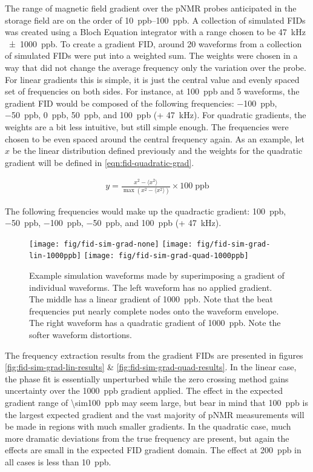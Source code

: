The range of magnetic field gradient over the pNMR probes anticipated in the \gmtwo storage field are on the order of \SIrange{10}{100}{ppb}. A collection of simulated FIDs was created using a Bloch Equation integrator with a range chosen to be \SI{47}{\kHz} \SI{\pm 1000}{ppb}. To create a gradient FID, around 20 waveforms from a collection of simulated FIDs were put into a weighted sum.  The weights were chosen in a way that did not change the average frequency only the variation over the probe.  For linear gradients this is simple, it is just the central value and evenly spaced set of frequencies on both sides.  For instance, at \SI{100}{ppb} and 5 waveforms, the gradient FID would be composed of the following frequencies: \SI{-100}{ppb}, \SI{-50}{ppb}, \SI{0}{ppb}, \SI{50}{ppb}, and \SI{100}{ppb} (+ \SI{47}{\kHz}).  For quadratic gradients, the weights are a bit less intuitive, but still simple enough.  The frequencies were chosen to be even spaced around the central frequency again.  As an example, let $x$ be the linear distribution defined previously and the weights for the quadratic gradient will be defined in \ref{eqn:fid-quadratic-grad}.

\begin{align}
\label{eqn:fid-quadratic-grad}
y = \frac{x^2 - \langle x^2 \rangle}{\max{(x^2 - \langle x^2 \rangle)}} \times \mathrm{100\; ppb}
\end{align}

\noindent
The following frequencies would make up the quadractic gradient: \SI{100}{ppb}, \SI{-50}{ppb}, \SI{-100}{ppb}, \SI{-50}{ppb}, and \SI{100}{ppb} (+ \SI{47}{\kHz}).

\begin{figure}
\centering
\texttt{[image: fig/fid-sim-grad-none]}
\texttt{[image: fig/fid-sim-grad-lin-1000ppb]}
\texttt{[image: fig/fid-sim-grad-quad-1000ppb]}
\caption{
    Example simulation waveforms made by superimposing a gradient of individual waveforms.  The left waveform has no applied gradient.  The middle has a linear gradient of \SI{1000}{ppb}.  Note that the beat frequencies put nearly complete nodes onto the waveform envelope.  The right waveform has a quadratic gradient of \SI{1000}{ppb}.  Note the softer waveform distortions.
    \label{fig:fid-sim-grad}
}
\end{figure}

The frequency extraction results from the gradient FIDs are presented in figures \ref{fig:fid-sim-grad-lin-results} \& \ref{fig:fid-sim-grad-quad-results}.  In the linear case, the phase fit is essentially unperturbed while the zero crossing method gains uncertainty over the \SI{1000}{ppb} gradient applied.  The effect in the expected gradient range of \SI{\sim100}{ppb} may seem large, but bear in mind that \SI{100}{ppb} is the largest expected gradient and the vast majority of pNMR measurements will be made in regions with much smaller gradients.  In the quadratic case, much more dramatic deviations from the true frequency are present, but again the effects are small in the expected FID gradient domain.  The effect at \SI{200}{ppb} in all cases is less than \SI{10}{ppb}.

